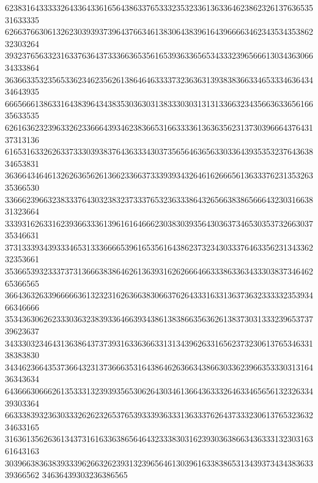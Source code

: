 62383164333332643364336165643863376533323532336136336462386232613763653531633335
62663766306132623039393739643766346138306438396164396666346234353435386232303264
39323765633231633763643733366365356165393633656534333239656661303436306634333864
36366335323565336234623562613864646333373236363139383836633465333463643434643935
66656661386331643839643438353036303138333030313131336632343566363365616635633535
62616362323963326233666439346238366531663333613636356231373039666437643137313136
61653163326263373330393837643633343037356564636563303364393535323764363834653831
36366434646132626365626136623366373339393432646162666561363337623135326335366530
33666239663238333764303238323733376532363338643265663838656664323031663831323664
33393162633162393663336139616164666230383039356430363734653035373266303735346631
37313339343933346531333666653961653561643862373234303337646335623134336232353661
35366539323337373136663838646261363931626266646633386336343330383734646265366565
36643632633966666361323231626366383066376264333163313637363233333235393466346666
35343630626233303632383933646639343861383866356362613837303133323965373739623637
34333032346431363864373739316336366331313439626331656237323061376534633138383830
34346236643537366432313736663531643864626366343866303362396635333031316436343634
64366630666261353331323939356530626430346136643633326463346565613232633439303364
66333839323630333262623265376539333936333136333762643733323061376532363234633165
31636135626361343731616336386564643233383031623930363866343633313230316361643163
30396638363839333962663262393132396564613039616338386531343937343438363339366562
34636439303236386565
